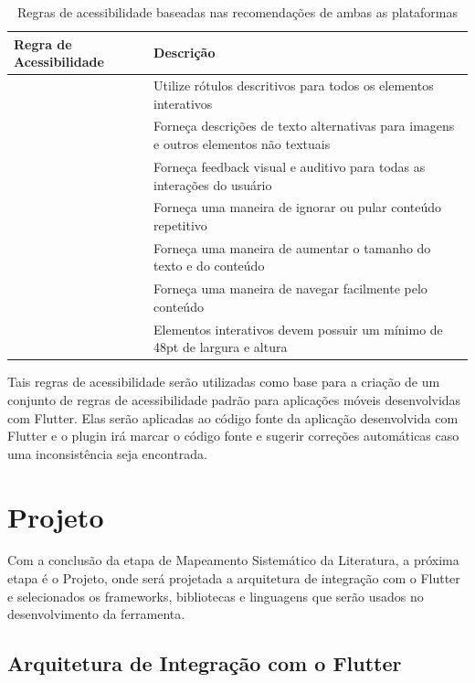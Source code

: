 \begin{table}[!htbp]
	\centering
	\renewcommand{\arraystretch}{1.1}
	\caption{Regras de acessibilidade baseadas nas recomendações de ambas as plataformas}
	\label{tab:regras-acessibilidade}
	\begin{tabular}{ R{4cm}  L{10cm} }
		\hline
		Regra de Acessibilidade & Descrição \\
		\hline
		\thera\label{ra:tooltip} & Utilize rótulos descritivos para todos os elementos interativos \\
		\thera & Forneça descrições de texto alternativas para imagens e outros elementos não textuais \\
		\thera & Forneça feedback visual e auditivo para todas as interações do usuário \\
		\thera & Forneça uma maneira de ignorar ou pular conteúdo repetitivo \\
		\thera & Forneça uma maneira de aumentar o tamanho do texto e do conteúdo \\
		\thera & Forneça uma maneira de navegar facilmente pelo conteúdo \\
		\thera & Elementos interativos devem possuir um mínimo de 48pt de largura e altura \\
		\hline
	\end{tabular}
	\vspace{2mm}
\end{table}

Tais regras de acessibilidade serão utilizadas como base para a criação de um conjunto de regras de acessibilidade padrão para aplicações móveis desenvolvidas com Flutter. Elas serão aplicadas ao código fonte da aplicação desenvolvida com Flutter e o plugin irá marcar o código fonte e sugerir correções automáticas caso uma inconsistência seja encontrada.

\section{Projeto}

Com a conclusão da etapa de Mapeamento Sistemático da Literatura, a próxima etapa é o Projeto, onde será projetada a arquitetura de integração com o Flutter e selecionados os frameworks, bibliotecas e linguagens que serão usados no desenvolvimento da ferramenta.

\subsection{Arquitetura de Integração com o Flutter}

